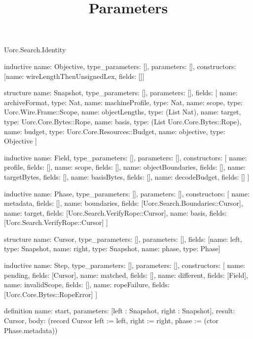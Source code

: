 \begin{lexlean}{Uorc.Search.Identity}
\title{Parameters}
\begin{semanticmodule}
inductive{
  name: Objective,
  type_parameters: [],
  parameters: [],
  constructors: [{name: wireLengthThenUnsignedLex, fields: []}]
}

structure{
  name: Snapshot,
  type_parameters: [],
  parameters: [],
  fields: [
    {name: archiveFormat, type: Nat},
    {name: machineProfile, type: Nat},
    {name: scope, type: Uorc.Wire.Frame::Scope},
    {name: objectLengths, type: (List Nat)},
    {name: target, type: Uorc.Core.Bytes::Rope},
    {name: basis, type: (List Uorc.Core.Bytes::Rope)},
    {name: budget, type: Uorc.Core.Resources::Budget},
    {name: objective, type: Objective}
  ]
}

inductive{
  name: Field,
  type_parameters: [],
  parameters: [],
  constructors: [
    {name: profile, fields: []},
    {name: scope, fields: []},
    {name: objectBoundaries, fields: []},
    {name: targetBytes, fields: []},
    {name: basisBytes, fields: []},
    {name: decodeBudget, fields: []}
  ]
}

inductive{
  name: Phase,
  type_parameters: [],
  parameters: [],
  constructors: [
    {name: metadata, fields: []},
    {name: boundaries, fields: [Uorc.Search.Boundaries::Cursor]},
    {name: target, fields: [Uorc.Search.VerifyRope::Cursor]},
    {name: basis, fields: [Uorc.Search.VerifyRope::Cursor]}
  ]
}

structure{
  name: Cursor,
  type_parameters: [],
  parameters: [],
  fields: [{name: left, type: Snapshot}, {name: right, type: Snapshot}, {name: phase, type: Phase}]
}

inductive{
  name: Step,
  type_parameters: [],
  parameters: [],
  constructors: [
    {name: pending, fields: [Cursor]},
    {name: matched, fields: []},
    {name: different, fields: [Field]},
    {name: invalidScope, fields: []},
    {name: ropeFailure, fields: [Uorc.Core.Bytes::RopeError]}
  ]
}

definition{
  name: start,
  parameters: [left : Snapshot, right : Snapshot],
  result: Cursor,
  body: (record Cursor {left := left, right := right, phase := (ctor Phase.metadata)})
}


\end{semanticmodule}
\end{lexlean}
